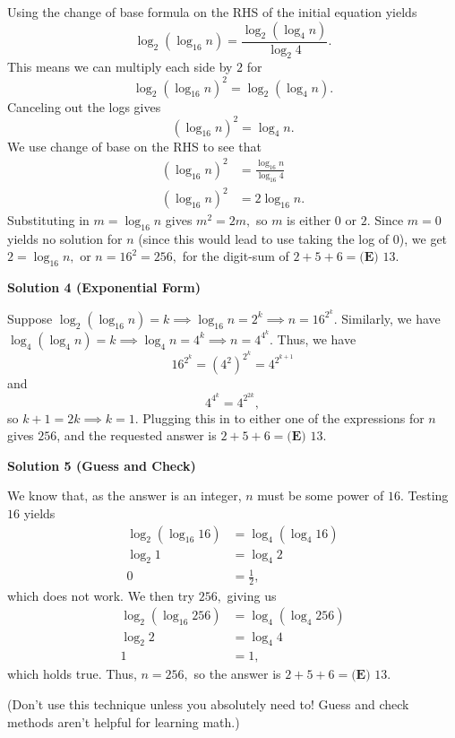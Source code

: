 \begin{enumerate}
Using the change of base formula on the RHS of the initial equation yields 
 \[\log_2{(\log_{16}{n})} = \frac{\log_2{(\log_4{n})}}{\log_2{4}}.\]This means we can multiply each side by $2$ for 
 \[\log_2{(\log_{16}{n})^2} = \log_2{(\log_4{n})}.\]Canceling out the logs gives
 \[(\log_{16}{n})^2=\log_4{n}.\]We use change of base on the RHS to see that 
 \begin{align*} (\log_{16}{n})^2&=\frac{ \log_{16}{n}}{\log_{16}{4}} \\ (\log_{16}{n})^2&=2 \log_{16}{n}. \end{align*}
Substituting in $m = \log_{16}{n}$ gives $m^2=2m,$ so $m$ is either $0$ or $2.$ Since $m=0$ yields no solution for $n$ (since this would lead to use taking the log of $0$), we get $2 = \log_{16}{n},$ or $n=16^2=256,$ for the digit-sum of $2 + 5 + 6 = \boxed{\textbf{(E) } 13}.$




\textbf{Solution 4 (Exponential Form)}

Suppose $\log_2(\log_{16}n)=k\implies\log_{16}n=2^k\implies n=16^{2^k}.$ Similarly, we have $\log_4(\log_4 n)=k\implies \log_4 n=4^k\implies n=4^{4^k}.$ Thus, we have 
 \[16^{2^k}=(4^2)^{2^k}=4^{2^{k+1}}\] and 
 \[4^{4^k}=4^{2^{2k}},\] so $k+1=2k\implies k=1.$ Plugging this in to either one of the expressions for $n$ gives $256$, and the requested answer is $2+5+6=\boxed{\textbf{(E) } 13}.$




\textbf{Solution 5 (Guess and Check)}

We know that, as the answer is an integer, $n$ must be some power of $16.$ Testing $16$ yields
 \begin{align*} \log_2{(\log_{16}{16})} &= \log_4{(\log_4{16})} \\ \log_2{1} &= \log_4{2} \\ 0 &= \frac{1}{2}, \end{align*}
which does not work. We then try $256,$ giving us
 \begin{align*} \log_2{(\log_{16}{256})} &= \log_4{(\log_4{256})} \\ \log_2{2} &= \log_4{4} \\ 1 &= 1, \end{align*}
which holds true. Thus, $n = 256,$ so the answer is $2 + 5 + 6 = \boxed{\textbf{(E) } 13}.$

 (Don't use this technique unless you absolutely need to! Guess and check methods aren't helpful for learning math.)

 



\end{enumerate}
